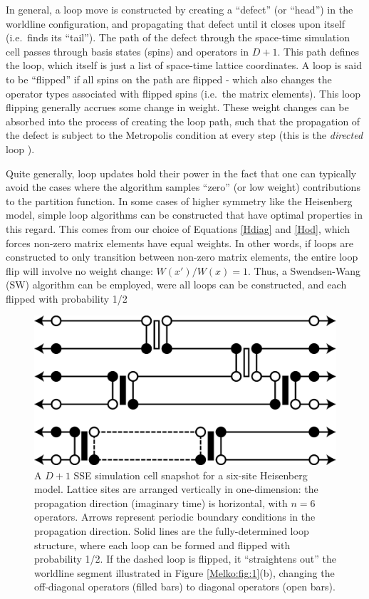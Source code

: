 \documentclass[vecphys]{svmult}
\begin{document}
In general, a loop move is constructed by creating a ``defect'' (or ``head'') in the worldline configuration, and propagating that defect until it closes upon itself (i.e.~finds its ``tail'').  The path of the defect through the space-time simulation cell passes through basis states (spins) and operators in $D+1$.  This path defines the loop, which itself is just a list of space-time lattice coordinates.  A loop is said to be ``flipped'' if all spins on the path are flipped - which also changes the operator types associated with flipped spins (i.e.~the matrix elements).
This loop flipping generally accrues some change in weight.  These weight changes can be absorbed into the process of creating the loop path, such that the propagation of the defect is subject to the Metropolis condition at every step (this is the {\em directed} loop \cite{Melko:Syljuasen02}).  

Quite generally, loop updates hold their power in the fact that one can typically avoid the cases where the algorithm samples ``zero'' (or low weight) contributions to the partition function.  In some cases of higher symmetry like the Heisenberg model, simple loop algorithms can be constructed that have optimal properties in this regard.  This comes from our choice of Equations \ref{Hdiag} and \ref{Hod}, which forces non-zero matrix elements have equal weights.  In other words, if loops are constructed to only transition between non-zero matrix elements, the entire loop flip will involve no weight change: $W(x')/W(x) = 1$.  Thus, a Swendsen-Wang (SW) algorithm can be employed, were
all loops can be constructed, and each flipped with probability 1/2 \cite{Melko:Swendsen88} 

\begin{figure}[t]
\centering
\includegraphics*[width=.9\textwidth]{finiteT_heis.eps}
\caption[]{A $D+1$ SSE simulation cell snapshot for a six-site Heisenberg model.  Lattice sites are arranged vertically in one-dimension: the propagation direction (imaginary time) is horizontal, with $n=6$ operators.  Arrows represent periodic boundary conditions in the propagation direction.  Solid lines are the fully-determined loop structure, where each loop can be formed and flipped with probability 1/2.  If the dashed loop is flipped, it ``straightens out'' the worldline segment illustrated in Figure \ref{Melko:fig:1}(b), changing the off-diagonal operators (filled bars) to diagonal operators (open bars).}
\label{Melko:fig:2}       %
\end{figure} 
\end{document}
